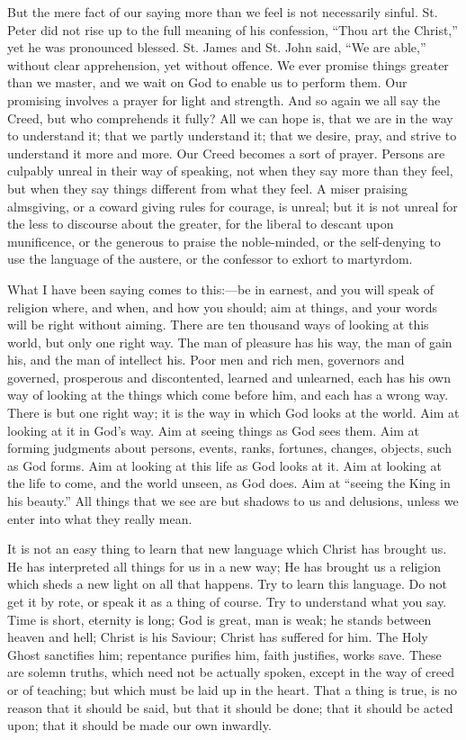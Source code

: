 But the mere fact of our saying more than we feel is not
necessarily sinful. St. Peter did not rise up to the full meaning of
his confession, ``Thou art the Christ,'' yet he was pronounced
blessed. St. James and St. John said, ``We are able,'' without
clear apprehension, yet without offence. We ever promise things
greater than we master, and we wait on God to enable us to perform
them. Our promising involves a prayer for light and strength. And so
again we all say the Creed, but who comprehends it fully? All we can
hope is, that we are in the way to understand it; that we partly
understand it; that we desire, pray, and strive to understand it more
and more. Our Creed becomes a sort of prayer. Persons are culpably
unreal in their way of speaking, not when they say more than they
feel, but when they say things different from what they feel. A miser
praising almsgiving, or a coward giving rules for courage, is unreal;
but it is not unreal for the less to discourse about the greater, for
the liberal to descant upon munificence, or the generous to praise the
noble-minded, or the self-denying to use the language of the austere,
or the confessor to exhort to martyrdom.

What I have been saying comes to this:—be in earnest, and you
will speak of religion where, and when, and how you should; aim at
things, and your words will be right without aiming. There are ten
thousand ways of looking at this world, but only one right way. The
man of pleasure has his way, the man of gain his, and the man of
intellect his. Poor men and rich men, governors and governed,
prosperous and discontented, learned and unlearned, each has his own
way of looking at the things which come before him, and each has a
wrong way. There is but one right way; it is the way in which God
looks at the world. Aim at looking at it in God's way. Aim at seeing
things as God sees them. Aim at forming judgments about persons,
events, ranks, fortunes, changes, objects, such as God forms. Aim at
looking at this life as God looks at it. Aim at looking at the life to
come, and the world unseen, as God does. Aim at ``seeing the King
in his beauty.'' All things that we see are but shadows to us and delusions,
unless we enter into what they really mean.

It is not an easy thing to learn that new language which Christ has
brought us. He has interpreted all things for us in a new way; He has
brought us a religion which sheds a new light on all that happens. Try
to learn this language. Do not get it by rote, or speak it as a thing
of course. Try to understand what you say. Time is short, eternity is
long; God is great, man is weak; he stands between heaven and hell;
Christ is his Saviour; Christ has suffered for him. The Holy Ghost
sanctifies him; repentance purifies him, faith justifies, works save.
These are solemn truths, which need not be actually spoken, except in
the way of creed or of teaching; but which must be laid up in the
heart. That a thing is true, is no reason that it should be said, but
that it should be done; that it should be acted upon; that it should
be made our own inwardly.

